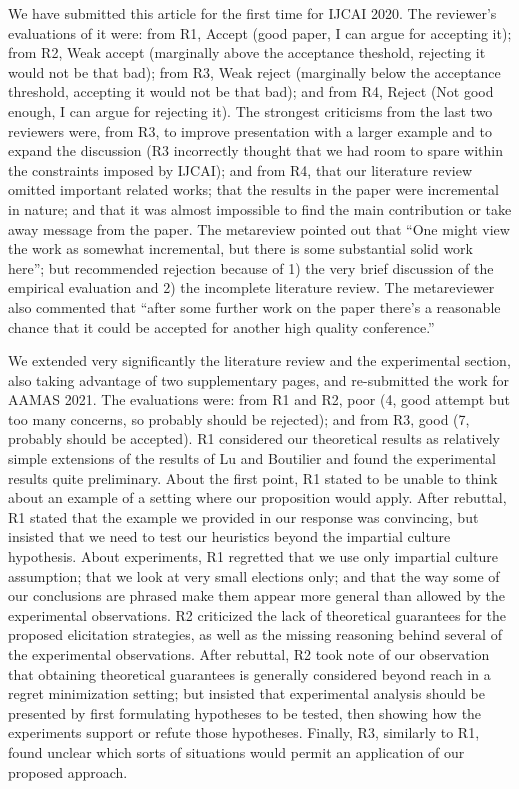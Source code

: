 \documentclass[version=3.21, pagesize, twoside=off, bibliography=totoc, DIV=calc, fontsize=12pt, a4paper]{scrartcl}
\begin{document}
We have submitted this article for the first time for IJCAI 2020. The reviewer’s evaluations of it were: from R1, Accept (good paper, I can argue for accepting it); from R2, Weak accept (marginally above the acceptance theshold, rejecting it would not be that bad); from R3, Weak reject (marginally below the acceptance threshold, accepting it would not be that bad); and from R4, Reject (Not good enough, I can argue for rejecting it). The strongest criticisms from the last two reviewers were, from R3, to improve presentation with a larger example and to expand the discussion (R3 incorrectly thought that we had room to spare within the constraints imposed by IJCAI); and from R4, that our literature review omitted important related works; that the results in the paper were incremental in nature; and that it was almost impossible to find the main contribution or take away message from the paper. The metareview pointed out that “One might view the work as somewhat incremental, but there is some substantial solid work here”; but recommended rejection because of 1) the very brief discussion of the empirical evaluation and 2) the incomplete literature review. The metareviewer also commented that “after some further work on the paper there's a reasonable chance that it could be accepted for another high quality conference.”

We extended very significantly the literature review and the experimental section, also taking advantage of two supplementary pages, and re-submitted the work for AAMAS 2021. The evaluations were: from R1 and R2, poor (4, good attempt but too many concerns, so probably should be rejected); and from R3, good (7, probably should be accepted). R1 considered our theoretical results as relatively simple extensions of the results of Lu and Boutilier and found the experimental results quite preliminary. About the first point, R1 stated to be unable to think about an example of a setting where our proposition would apply. After rebuttal, R1 stated that the example we provided in our response was convincing, but insisted that we need to test our heuristics beyond the impartial culture hypothesis. About experiments, R1 regretted that we use only impartial culture assumption; that we look at very small elections only; and that the way some of our conclusions are phrased make them appear more general than allowed by the experimental observations. R2 criticized the lack of theoretical guarantees for the proposed elicitation strategies, as well as the missing reasoning behind several of the experimental observations. After rebuttal, R2 took note of our observation that obtaining theoretical guarantees is generally considered beyond reach in a regret minimization setting; but insisted that experimental analysis should be presented by first formulating hypotheses to be tested, then showing how the experiments support or refute those hypotheses. Finally, R3, similarly to R1, found unclear which sorts of situations would permit an application of our proposed approach.
\end{document}
